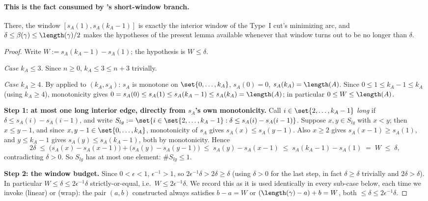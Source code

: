\begin{lemma}
  \paragraph{This is the fact consumed by 's short-window branch.} There, the
  window $[s_A(1),s_A(k_A-1)]$ is exactly the interior window of the Type~I cut's minimizing arc,
  and $\delta \le \beta(\gamma) \le \length(\gamma)/2$ makes the hypotheses of the present lemma
  available whenever that window turns out to be no longer than $\delta$.
\end{lemma}
\begin{proof}
  Write $W := s_A(k_A-1)-s_A(1)$; the hypothesis is $W\le\delta$.

  \emph{Case $k_A\le3$.} Since $n\ge0$, $k_A\le3\le n+3$ trivially.

  \emph{Case $k_A\ge4$.} By  applied to $(k_A,s_A)$: $s_A$ is
  monotone on $\set{0,\dots,k_A}$, $s_A(0)=0$, $s_A(k_A)=\length(A)$. Since
  $0\le1\le k_A-1\le k_A$ (using $k_A\ge4$), monotonicity gives
  $0=s_A(0)\le s_A(1)\le s_A(k_A-1)\le s_A(k_A)=\length(A)$; in particular $0\le W\le\length(A)$.

  \textbf{Step 1: at most one long interior edge, directly from $s_A$'s own monotonicity.} Call
  $i\in\set{2,\dots,k_A-1}$ \emph{long} if $\delta\le s_A(i)-s_A(i-1)$, and write
  $S_{lg} := \set{i\in\set{2,\dots,k_A-1} : \delta\le s_A(i)-s_A(i-1)}$. Suppose $x,y\in S_{lg}$
  with $x<y$; then $x\le y-1$, and since $x,y-1\in\set{0,\dots,k_A}$, monotonicity of $s_A$ gives
  $s_A(x)\le s_A(y-1)$. Also $x\ge2$ gives $s_A(x-1)\ge s_A(1)$, and $y\le k_A-1$ gives
  $s_A(y)\le s_A(k_A-1)$, both by monotonicity. Hence
  \[
    2\delta \;\le\; \bigl(s_A(x)-s_A(x-1)\bigr)+\bigl(s_A(y)-s_A(y-1)\bigr)
    \;\le\; s_A(y)-s_A(x-1) \;\le\; s_A(k_A-1)-s_A(1) \;=\; W \;\le\; \delta
    ,
  \]
  contradicting $\delta>0$. So $S_{lg}$ has at most one element: $\#S_{lg}\le1$.

  \textbf{Step 2: the window budget.} Since $0<\epsilon<1$, $\epsilon^{-1}>1$, so
  $2\epsilon^{-1}\delta > 2\delta \ge \delta$ (using $\delta>0$ for the last step, in fact
  $\delta \ge \delta$ trivially and $2\delta > \delta$). In particular $W\le\delta\le2\epsilon^{-1}\delta$
  strictly-or-equal, i.e.\ $W\le2\epsilon^{-1}\delta$. We record this as it is used identically in
  every sub-case below, each time we invoke (linear) or (wrap): the pair $(a,b)$ constructed always
  satisfies $b-a=W$ or $(\length(\gamma)-a)+b=W$, both $\le\delta\le2\epsilon^{-1}\delta$.


\end{proof}
